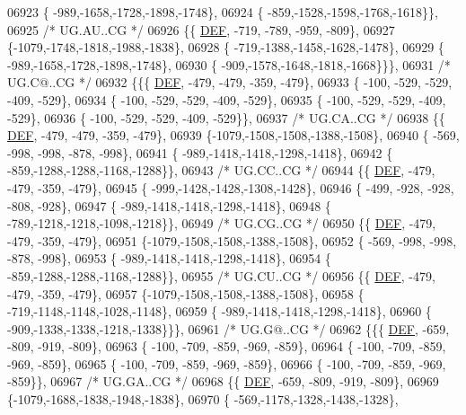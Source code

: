 \begin{DoxyCode}
06923 \{ -989,-1658,-1728,-1898,-1748\},
06924 \{ -859,-1528,-1598,-1768,-1618\}\},
06925 \textcolor{comment}{/* UG.AU..CG */}
06926 \{\{  \mbox{\hyperlink{1_88_84__epars_8h_a397419fc12b37ed479c8abb9d444d843}{DEF}}, -719, -789, -959, -809\},
06927 \{-1079,-1748,-1818,-1988,-1838\},
06928 \{ -719,-1388,-1458,-1628,-1478\},
06929 \{ -989,-1658,-1728,-1898,-1748\},
06930 \{ -909,-1578,-1648,-1818,-1668\}\}\},
06931 \textcolor{comment}{/* UG.C@..CG */}
06932 \{\{\{  \mbox{\hyperlink{1_88_84__epars_8h_a397419fc12b37ed479c8abb9d444d843}{DEF}}, -479, -479, -359, -479\},
06933 \{ -100, -529, -529, -409, -529\},
06934 \{ -100, -529, -529, -409, -529\},
06935 \{ -100, -529, -529, -409, -529\},
06936 \{ -100, -529, -529, -409, -529\}\},
06937 \textcolor{comment}{/* UG.CA..CG */}
06938 \{\{  \mbox{\hyperlink{1_88_84__epars_8h_a397419fc12b37ed479c8abb9d444d843}{DEF}}, -479, -479, -359, -479\},
06939 \{-1079,-1508,-1508,-1388,-1508\},
06940 \{ -569, -998, -998, -878, -998\},
06941 \{ -989,-1418,-1418,-1298,-1418\},
06942 \{ -859,-1288,-1288,-1168,-1288\}\},
06943 \textcolor{comment}{/* UG.CC..CG */}
06944 \{\{  \mbox{\hyperlink{1_88_84__epars_8h_a397419fc12b37ed479c8abb9d444d843}{DEF}}, -479, -479, -359, -479\},
06945 \{ -999,-1428,-1428,-1308,-1428\},
06946 \{ -499, -928, -928, -808, -928\},
06947 \{ -989,-1418,-1418,-1298,-1418\},
06948 \{ -789,-1218,-1218,-1098,-1218\}\},
06949 \textcolor{comment}{/* UG.CG..CG */}
06950 \{\{  \mbox{\hyperlink{1_88_84__epars_8h_a397419fc12b37ed479c8abb9d444d843}{DEF}}, -479, -479, -359, -479\},
06951 \{-1079,-1508,-1508,-1388,-1508\},
06952 \{ -569, -998, -998, -878, -998\},
06953 \{ -989,-1418,-1418,-1298,-1418\},
06954 \{ -859,-1288,-1288,-1168,-1288\}\},
06955 \textcolor{comment}{/* UG.CU..CG */}
06956 \{\{  \mbox{\hyperlink{1_88_84__epars_8h_a397419fc12b37ed479c8abb9d444d843}{DEF}}, -479, -479, -359, -479\},
06957 \{-1079,-1508,-1508,-1388,-1508\},
06958 \{ -719,-1148,-1148,-1028,-1148\},
06959 \{ -989,-1418,-1418,-1298,-1418\},
06960 \{ -909,-1338,-1338,-1218,-1338\}\}\},
06961 \textcolor{comment}{/* UG.G@..CG */}
06962 \{\{\{  \mbox{\hyperlink{1_88_84__epars_8h_a397419fc12b37ed479c8abb9d444d843}{DEF}}, -659, -809, -919, -809\},
06963 \{ -100, -709, -859, -969, -859\},
06964 \{ -100, -709, -859, -969, -859\},
06965 \{ -100, -709, -859, -969, -859\},
06966 \{ -100, -709, -859, -969, -859\}\},
06967 \textcolor{comment}{/* UG.GA..CG */}
06968 \{\{  \mbox{\hyperlink{1_88_84__epars_8h_a397419fc12b37ed479c8abb9d444d843}{DEF}}, -659, -809, -919, -809\},
06969 \{-1079,-1688,-1838,-1948,-1838\},
06970 \{ -569,-1178,-1328,-1438,-1328\},

\end{DoxyCode}
